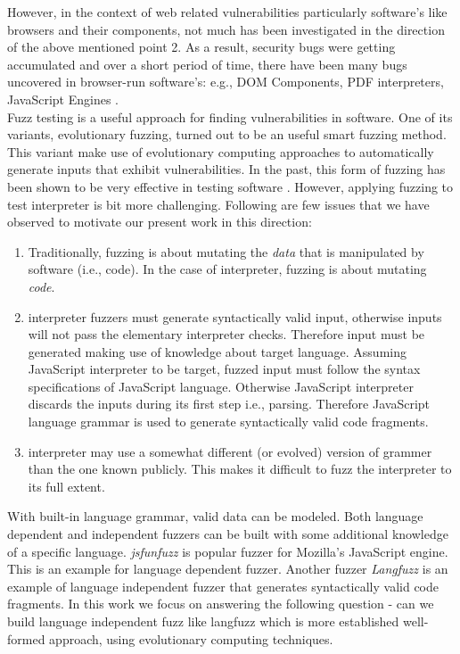\documentclass{acm_proc_article-sp}
\begin{document}
However, in the context of web related vulnerabilities particularly software's like browsers and their components, not much has been investigated in the direction of the above mentioned point 2. As a result, security bugs were getting accumulated and over a short period of time, there have been many bugs uncovered in browser-run software's: e.g., DOM Components, PDF interpreters, JavaScript Engines \cite{Holler11}.\\
\indent Fuzz testing is a useful approach for finding vulnerabilities in software. One of its variants, evolutionary fuzzing, turned out to be an useful smart fuzzing method. This variant make use of evolutionary computing approaches to automatically generate inputs that exhibit vulnerabilities. In the past, this form of fuzzing has been shown to be very effective in testing software \cite{4682289,Duchene:2014,Rawat:2010,sparks2007,DelGrosso:2008,Alba:2005}. However, applying fuzzing to test interpreter is bit more challenging. Following are few issues that we have observed to motivate our present work in this direction:
\begin{enumerate}
\item Traditionally, fuzzing is about mutating the \emph{data} that is manipulated by software (i.e., code). In the case of interpreter, fuzzing is about mutating \emph{code}.
\item interpreter fuzzers must generate syntactically valid input, otherwise inputs will not pass the elementary interpreter checks. Therefore input must be generated making use of knowledge about target language. Assuming JavaScript interpreter to be target, fuzzed input must follow the syntax specifications of JavaScript language. Otherwise JavaScript interpreter discards the inputs during its first step i.e., parsing. Therefore JavaScript language grammar is used to generate syntactically valid code fragments. 
\item interpreter may use a somewhat different (or evolved) version of grammer than the one known publicly. This makes it difficult to fuzz the interpreter to its full extent.
\end{enumerate}
\indent  With built-in language grammar, valid data can be modeled. Both language dependent and independent fuzzers can be built with some additional knowledge of a specific language. \textit{jsfunfuzz} \cite{Jesse07} is popular fuzzer for Mozilla's JavaScript engine. This is an example for language dependent fuzzer. Another fuzzer \textit{Langfuzz} \cite{Holler11} is an example of language independent fuzzer that generates syntactically valid code fragments. In this work we focus on answering the following question - can we build language independent fuzz like langfuzz which is more established well-formed approach, using evolutionary computing techniques.
\end{document}
